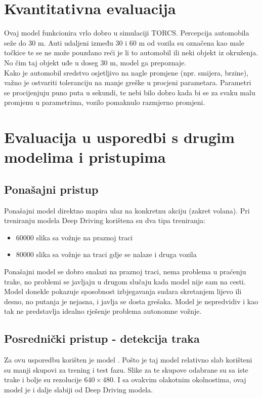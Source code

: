 \documentclass[seminar, utf8, numeric]{fer}
\begin{document}
\section{Kvantitativna evaluacija}
Ovaj model funkcionira vrlo dobro u simulaciji TORCS. Percepcija automobila seže do 30 m. Auti udaljeni između 30 i 60 m od vozila su označena kao male točkice te se ne može pouzdano reći je li to automobil ili neki objekt iz okruženja. No čim taj objekt uđe u doseg 30 m, model ga prepoznaje. \\
Kako je automobil sredstvo osjetljivo na nagle promjene (npr. smijera, brzine), važno je ostvariti toleranciju na manje greške u procjeni parametara. Parametri se procijenjuju puno puta u sekundi, te nebi bilo dobro kada bi se za svaku malu promjenu u parametrima, vozilo pomaknulo razmjerno promjeni. 

\pagebreak
\section{Evaluacija u usporedbi s drugim modelima i pristupima}
\subsection{Ponašajni pristup}
Ponašajni model direktno mapira ulaz na konkretnu akciju (zakret volana). Pri treniranju modela Deep Driving korištena su dva tipa treniranja:
\begin{itemize}
	\item 60000 slika sa vožnje na praznoj traci
	\item 80000 slika sa vožnje na traci gdje se nalaze i druga vozila
\end{itemize} 
Ponašajni model se dobro snalazi na praznoj traci, nema problema u praćenju trake, no problemi se javljaju u drugom slučaju kada model nije sam na cesti. Model donekle pokazuje sposobnost izbjegavanja sudara skretanjem lijevo ili desno, no putanja je nejasna, i javlja se dosta grešaka. Model je nepredvidiv i kao tak ne predstavlja idealno rješenje problema autonomne vožnje.

\subsection{Posrednički pristup - detekcija traka}
Za ovu usporedbu korišten je model \cite{lda}. Pošto je taj model relativno slab korišteni su manji skupovi za trening i test fazu. Slike za te skupove odabrane su sa iste trake i bolje su rezolucije $640 \times 480$. I sa ovakvim olakotnim okolnostima, ovaj model je i dalje slabiji od Deep Driving modela. 
\end{document}
